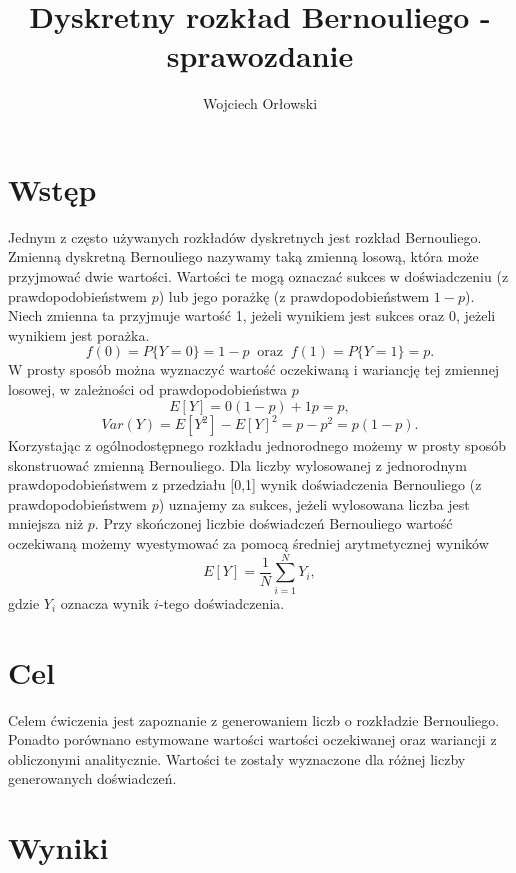 \documentclass[a4paper,12pt]{article}
\author{Wojciech Orłowski}
\title{Dyskretny rozkład Bernouliego - sprawozdanie}
\begin{document}
    \maketitle

    \section{Wstęp}

    Jednym z często używanych rozkładów dyskretnych jest rozkład Bernouliego.
    Zmienną dyskretną Bernouliego nazywamy taką zmienną losową, która może przyjmować dwie wartości.
    Wartości te mogą oznaczać sukces w doświadczeniu (z prawdopodobieństwem $p$) lub jego porażkę (z prawdopodobieństwem $1 - p$). 
    Niech zmienna ta przyjmuje wartość 1, jeżeli wynikiem jest sukces oraz 0, jeżeli wynikiem jest porażka.
    \[f(0) = P\{ Y = 0 \}  = 1 - p \; \; \text{oraz} \; \; 
        f(1) = P\{ Y = 1 \}  = p.\]
    W prosty sposób można wyznaczyć wartość oczekiwaną i wariancję tej zmiennej losowej, w zależności od prawdopodobieństwa $p$
    \[ E[Y] = 0(1-p) + 1p = p, \]
    \[ Var(Y) = E[Y^2] - E[Y]^2 = p - p^2 = p(1-p). \]  
    Korzystając z ogólnodostępnego rozkładu jednorodnego możemy w prosty sposób skonstruować zmienną Bernouliego.
    Dla liczby wylosowanej z jednorodnym prawdopodobieństwem z przedziału [0,1] wynik doświadczenia Bernouliego (z prawdopodobieństwem $p$) uznajemy za sukces, jeżeli wylosowana liczba jest mniejsza niż $p$.
    Przy skończonej liczbie doświadczeń Bernouliego wartość oczekiwaną możemy wyestymować za pomocą średniej arytmetycznej wyników
    \[ E[Y] = \frac{1}{N} \sum_{i = 1}^{N} Y_i, \]
    gdzie $Y_i$ oznacza wynik $i$-tego doświadczenia.

    \section{Cel}

    Celem ćwiczenia jest zapoznanie z generowaniem liczb o rozkładzie Bernouliego.
    Ponadto porównano estymowane wartości wartości oczekiwanej oraz wariancji z obliczonymi analitycznie.
    Wartości te zostały wyznaczone dla różnej liczby generowanych doświadczeń.

    \newpage

    \section{Wyniki}
\end{document}
